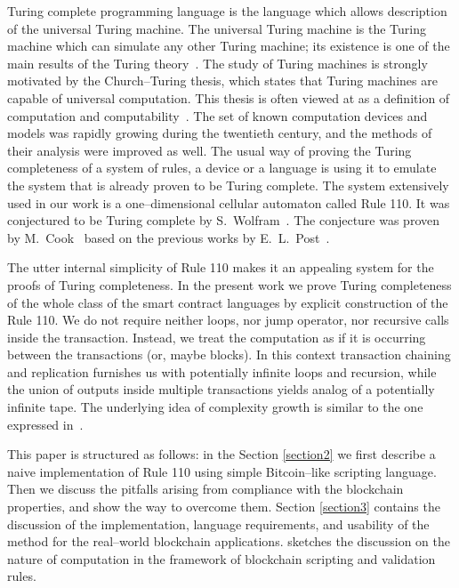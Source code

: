 \documentclass[runningheads]{llncs}
\begin{document}
    Turing complete programming language is the language which allows
    description of the universal Turing machine. The universal Turing machine is
    the Turing machine which can simulate any other Turing machine; its
    existence is one of the main results of the Turing
    theory~\cite{turing1937computable}. The study of Turing machines is strongly
    motivated by the Church--Turing thesis, which states that Turing machines
    are capable of universal computation. This thesis is often viewed at as a
    definition of computation and computability~\cite{turing1939systems}. The
    set of known computation devices and models was rapidly growing during the
    twentieth century, and the methods of their analysis were improved as well.
    The usual way of proving the Turing completeness of a system of rules,
    a device or a language is using it to emulate the system that is already
    proven to be Turing complete.  The system extensively used in our work is a
    one--dimensional cellular automaton called Rule 110. It was conjectured to
    be Turing complete by S.~Wolfram~\cite{wolfram1986theory}. The conjecture
    was proven by M.~Cook~\cite{cook2004universality} based on the previous
    works by E.~L.~Post~\cite{post1943formal}.

    The utter internal simplicity of Rule 110 makes it an appealing system for
    the proofs of Turing completeness. In the present work we prove Turing
    completeness of the whole class of the smart contract languages by explicit
    construction of the Rule 110. We do not require neither loops, nor jump
    operator, nor recursive calls inside the transaction. Instead, we treat the
    computation as if it is occurring between the transactions (or, maybe
    blocks). In this context transaction chaining and replication furnishes us
    with potentially infinite loops and recursion, while the union of outputs
    inside multiple transactions yields analog of a potentially infinite tape.
    The underlying idea of complexity growth is similar to the one expressed
    in~\cite{von1951general}.

    This paper is structured as follows: in the Section \ref{section2} we first
    describe a naive implementation of Rule 110 using simple Bitcoin--like
    scripting language.  Then we discuss the pitfalls arising from compliance
    with the blockchain properties, and show the way to overcome them.  Section
    \ref{section3} contains the discussion of the implementation, language
    requirements, and usability of the method for the real--world blockchain
    applications.  sketches the discussion on the nature of
    computation in the framework of blockchain scripting and validation rules.
\end{document}
